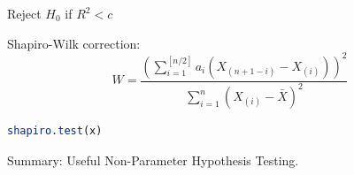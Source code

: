 \begin{itemize}
\begin{itemize}
        Reject $H_0$ if $R^2<c$

        Shapiro-Wilk correction:
        \begin{equation}
            W=\dfrac{\left(\sum_{i=1}^{[n/2]}a_i(X_{(n+1-i)}-X_{(i)})\right)^2}{\sum_{i=1}^n(X_{(i)}-\bar{X})^2}
        \end{equation}
\begin{rcode}
\begin{lstlisting}[language=R]
shapiro.test(x)
\end{lstlisting}
\end{rcode}
    \end{itemize}
\end{itemize}

\begin{point}
    Summary: Useful Non-Parameter Hypothesis Testing.
\end{point}
\\
\\


